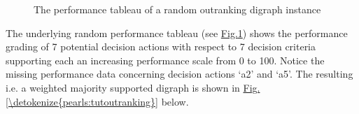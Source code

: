 \documentclass[a4paper,12pt,english]{sphinxhowto}
\let\sphinxpxdimen\pdfpxdimen\else\newdimen\sphinxpxdimen
\begin{document}
\begin{sphinxVerbatim}[commandchars=\\\{\},numbers=left,firstnumber=1,stepnumber=1]
   
  
\end{sphinxVerbatim}

\begin{figure}[H]
\centering
\capstart

\noindent\sphinxincludegraphics[width=550\sphinxpxdimen]{{randomOutranking}.png}
\caption{The performance tableau of a random outranking digraph instance}\label{\detokenize{pearls:randomoutranking}}\end{figure}

\sphinxAtStartPar
The underlying random performance tableau (see \hyperref[\detokenize{pearls:randomoutranking}]{Fig.\@ \ref{\detokenize{pearls:randomoutranking}}}) shows the performance grading of 7 potential decision actions with respect to 7 decision criteria supporting each an increasing performance scale from 0 to 100. Notice the missing performance data concerning decision actions ‘a2’ and ‘a5’. The resulting  \sphinxhyphen{} i.e. a weighted majority supported \sphinxhyphen{}  \sphinxhyphen{} digraph is shown in \hyperref[\detokenize{pearls:tutoutranking}]{Fig.\@ \ref{\detokenize{pearls:tutoutranking}}} below.
\end{document}
